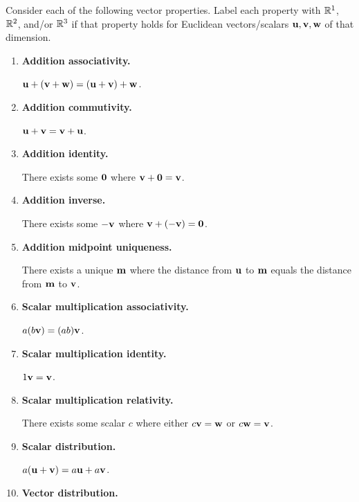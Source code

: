 


\begin{applicationActivities}


\begin{activity}{20}\smallSlideText
Consider each of the following vector properties. Label each property
with \(\mathbb{R}^1\), \(\mathbb{R}^2\), and/or \(\mathbb{R}^3\) if that property holds for
Euclidean vectors/scalars \(\mathbf u,\mathbf v,\mathbf w\) of that dimension.
\begin{multicols}{2}
\begin{enumerate}
  \item \textbf{Addition associativity.}

        \(\mathbf u+(\mathbf v+\mathbf w)=
        (\mathbf u+\mathbf v)+\mathbf w\).
  \item \textbf{Addition commutivity.}

        \(\mathbf u+\mathbf v=
        \mathbf v+\mathbf u\).
  \item \textbf{Addition identity.}

        There exists some \(\mathbf 0\)
        where \(\mathbf v+\mathbf 0=\mathbf v\).
  \item \textbf{Addition inverse.}

        There exists some \(-\mathbf v\)
        where \(\mathbf v+(-\mathbf v)=\mathbf 0\).
  \item \textbf{Addition midpoint uniqueness.}

        There exists a unique \(\mathbf m\) where the distance from
        \(\mathbf u\) to \(\mathbf m\) equals the distance from \(\mathbf m\)
        to \(\mathbf v\).
  \item \textbf{Scalar multiplication associativity.}

        \(a(b\mathbf v)=(ab)\mathbf v\).
  \item \textbf{Scalar multiplication identity.}

        \(1\mathbf v=\mathbf v\).
  \item \textbf{Scalar multiplication relativity.}

        There exists some scalar \(c\) where either \(c\mathbf v=\mathbf w\)
        or \(c\mathbf w=\mathbf v\).
  \item \textbf{Scalar distribution.}

        \(a(\mathbf u+\mathbf v)=a\mathbf u+a\mathbf v\).
  \item \textbf{Vector distribution.}


\end{enumerate}
\end{multicols}
\end{activity}
\end{applicationActivities}
